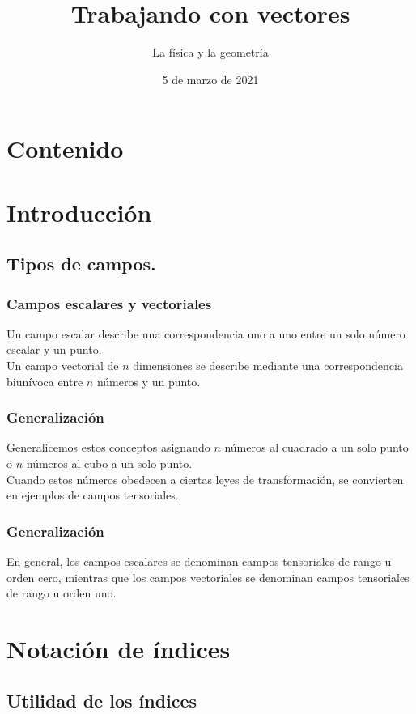 \documentclass[12pt]{beamer}
\date{5 de marzo de 2021}
\title{Trabajando con vectores}
\subtitle{La física y la geometría}
\begin{document}
\maketitle
\fontsize{14}{14}\selectfont
{}
\section*{Contenido}
\section{Introducción}
\subsection{Tipos de campos.}
\begin{frame}
\frametitle{Campos escalares y vectoriales}
Un campo escalar describe una correspondencia uno a uno entre un solo número escalar y un punto.
\\
\bigskip
\pause
Un campo vectorial de $n$ dimensiones se describe mediante una correspondencia biunívoca entre $n$ números y un punto. 
\end{frame}
\begin{frame}
\frametitle{Generalización}
Generalicemos estos conceptos asignando $n$ números al cuadrado a un solo punto o $n$ números al cubo a un solo punto.
\\
\bigskip
\pause
Cuando estos números obedecen a ciertas leyes de transformación, se convierten en ejemplos de campos tensoriales.
\end{frame}
\begin{frame}
\frametitle{Generalización}
En general, los campos escalares se denominan campos tensoriales de rango u orden cero, mientras que los campos vectoriales se denominan campos tensoriales de rango u orden uno.
\end{frame}

\section{Notación de índices}
\subsection{Utilidad de los índices}
\end{document}
